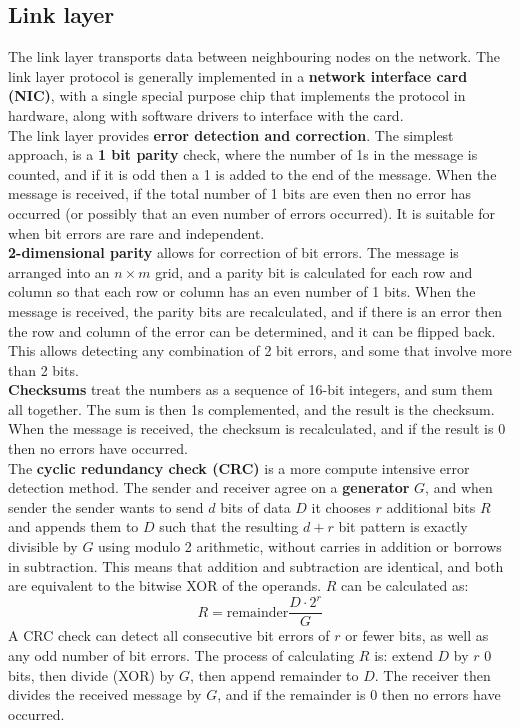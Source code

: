 \subsection{Link layer}
The link layer transports data between neighbouring nodes on the network. The link layer protocol is generally implemented in a \textbf{network interface card (NIC)}, with a single special purpose chip that implements the protocol in hardware, along with software drivers to interface with the card.\\
The link layer provides \textbf{error detection and correction}. The simplest approach, is a \textbf{1 bit parity} check, where the number of 1s in the message is counted, and if it is odd then a 1 is added to the end of the message. When the message is received, if the total number of 1 bits are even then no error has occurred (or possibly that an even number of errors occurred). It is suitable for when bit errors are rare and independent.\\
\textbf{2-dimensional parity} allows for correction of bit errors. The message is arranged into an $n\times m$ grid, and a parity bit is calculated for each row and column so that each row or column has an even number of 1 bits. When the message is received, the parity bits are recalculated, and if there is an error then the row and column of the error can be determined, and it can be flipped back. This allows detecting any combination of 2 bit errors, and some that involve more than 2 bits.\\
\textbf{Checksums} treat the numbers as a sequence of 16-bit integers, and sum them all together. The sum is then 1s complemented, and the result is the checksum. When the message is received, the checksum is recalculated, and if the result is 0 then no errors have occurred.\\
The \textbf{cyclic redundancy check (CRC)} is a more compute intensive error detection method. The sender and receiver agree on a \textbf{generator} $G$, and when sender the sender wants to send $d$ bits of data $D$ it chooses $r$ additional bits $R$ and appends them to $D$ such that the resulting $d+r$ bit pattern is exactly divisible by $G$ using modulo 2 arithmetic, without carries in addition or borrows in subtraction. This means that addition and subtraction are identical, and both are equivalent to the bitwise XOR of the operands. $R$ can be calculated as:
\[
	R=\text{remainder}\frac{D\cdot2^r}{G}
\]
A CRC check can detect all consecutive bit errors of $r$ or fewer bits, as well as any odd number of bit errors.
The process of calculating $R$ is: extend $D$ by $r$ 0 bits, then divide (XOR) by $G$, then append remainder to $D$. The receiver then divides the received message by $G$, and if the remainder is 0 then no errors have occurred.\\

